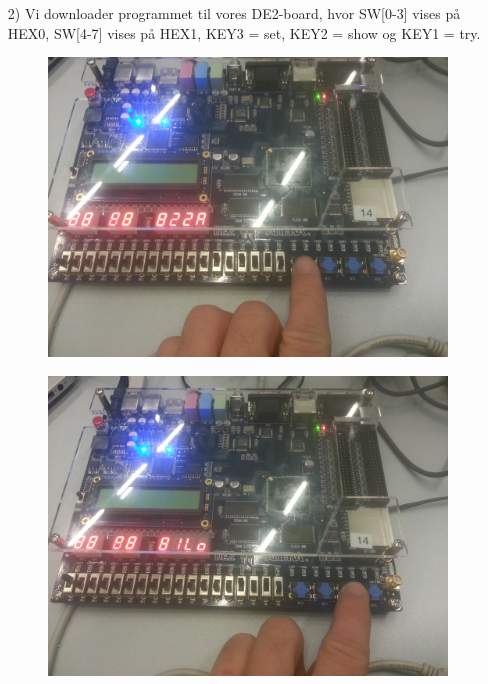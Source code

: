 \begin{enumerate}
\begin{lstlisting}[caption={Behavioral style kode for Guessgame},label={lst:Guessgame}]
		
		\end{lstlisting}
		\item[2)]
		Vi downloader programmet til vores DE2-board, hvor SW[0-3] vises på HEX0, SW[4-7] vises på HEX1, KEY3 = set, KEY2 = show og KEY1 = try. \\
		\begin{figure}[h]
			\centering
			\includegraphics[scale=0.8]{pictures/Oevelse5/opg3/guess_2p_set.JPG}
			\caption{}
			\label{fig:Guess2pSet}
		\end{figure}
		\begin{figure}[h]
			\centering
			\includegraphics[scale=0.8]{pictures/Oevelse5/opg3/guess_2p_try_lo.JPG}
			\caption{}
			\label{fig:Guess2pTryLo}
		\end{figure}

\end{enumerate}
